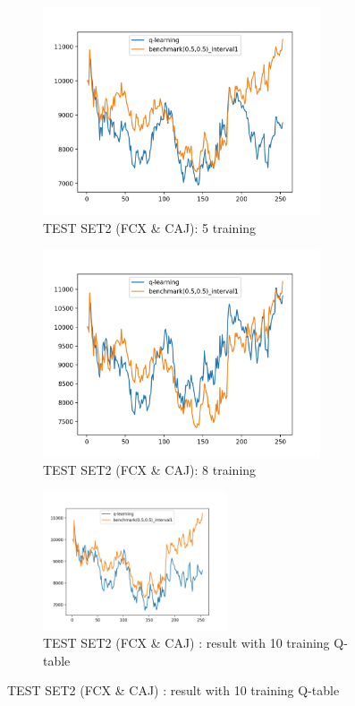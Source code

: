 \newpage

\begin{figure}[H]
\begin{subfigure}{.5\textwidth}%
\centering
\includegraphics[clip, width=0.9\textwidth]{Graphics/test_NM5_FC_action.jpg} \caption{TEST SET2 (FCX \& CAJ): 5 training} 
\end{subfigure}%
\vspace{0.1cm}
\begin{subfigure}{.5\textwidth}%
\centering
\includegraphics[clip, width=0.9\textwidth]{Graphics/test_AS8_FC_action.jpg} \caption{TEST SET2 (FCX \& CAJ): 8 training}
\end{subfigure}%
\begin{figure}[H]
\begin{center}
\includegraphics[clip, width=0.6\textwidth]{Graphics/test_NS10_FC_action.jpg} \caption{TEST SET2 (FCX \& CAJ) : result with 10 training Q-table}

\end{center}
\end{figure}
\end{figure}

